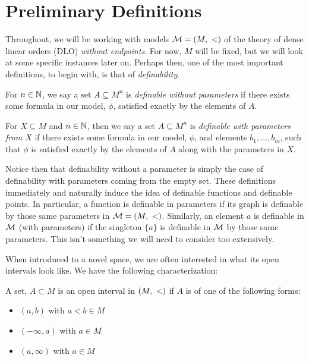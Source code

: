 \section{Preliminary Definitions}
\label{sec:prelim-defns}
Throughout, we will be working with models $ \mathcal{M} = (M, \ <)$ of the theory of dense linear orders (DLO) \emph{without endpoints}. For now, $M$ will be fixed, but we will look at some specific instances later on. Perhaps then, one of the most important definitions, to begin with, is that of \emph{definability}.

\begin{definition}
For $n \in \mathbb{N}$, we say a set $A \subseteq M^n$ is \emph{definable without parameters} if there exists some formula in our model, $ \phi$, satisfied exactly by the elements of $A$.
\end{definition}

\begin{definition}
For $X \subseteq M$ and $n \in \mathbb{N}$, then we say a set $A \subseteq M^n$ is \emph{definable with parameters from $X$} if there exists some formula in our model, $ \phi$, and elements $b_1, \hdots, b_m$, such that $ \phi$ is satisfied exactly by the elements of $A$ along with the parameters in $X$.
\end{definition}

Notice then that definability without a parameter is simply the case of definability with parameters coming from the empty set. These definitions immediately and naturally induce the idea of definable functions and definable points. In particular, a function is definable in parameters if its graph is definable by those same parameters in $\mathcal{M} = (M, \ <)$. Similarly, an element $a$ is definable in $\mathcal{M}$ (with parameters) if the singleton $\{a\}$ is definable in $ \mathcal{M}$ by those same parameters. This isn't something we will need to consider too extensively.

When introduced to a novel space, we are often interested in what its open intervals look like. We have the following characterization:

\begin{definition}
  A set, $A \subset M$ is an open interval in $(M, \ <)$ if $A$ is of one of the following forms:
  \begin{itemize}
    \item $(a, b)$ with $a < b \in M$
    \item $(- \infty, a)$ with $a \in M$
    \item $(a, \infty)$ with $a \in M$
  \end{itemize}
\end{definition}

